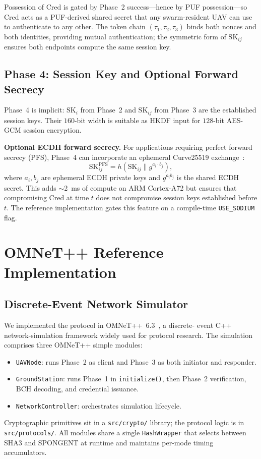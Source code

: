 \documentclass[journal,a4paper,10pt]{IEEEtran}
\begin{document}
Possession of $\mathrm{Cred}$ is gated by Phase~2 success---hence by
PUF possession---so $\mathrm{Cred}$ acts as a PUF-derived shared
secret that any swarm-resident UAV can use to authenticate to any
other. The token chain $(\tau_1,\tau_2,\tau_3)$ binds both nonces and
both identities, providing mutual authentication; the symmetric
form of $\mathrm{SK}_{ij}$ ensures both endpoints compute the same
session key.

\subsection{Phase 4: Session Key and Optional Forward Secrecy}
Phase~4 is implicit: $\mathrm{SK}_i$ from Phase~2 and
$\mathrm{SK}_{ij}$ from Phase~3 are the established session keys.
Their $160$-bit width is suitable as HKDF input for $128$-bit AES-GCM
session encryption.

\textbf{Optional ECDH forward secrecy.} For applications requiring
perfect forward secrecy (PFS), Phase~4 can incorporate an ephemeral
Curve25519 exchange~\cite{puf_key_exchange}:
\begin{equation}
\mathrm{SK}_{ij}^{\mathrm{PFS}} = h(\mathrm{SK}_{ij} \| g^{a_i \cdot b_j}),
\end{equation}
where $a_i, b_j$ are ephemeral ECDH private keys and
$g^{a_i b_j}$ is the shared ECDH secret. This adds $\sim$2~ms of
compute on ARM Cortex-A72 but ensures that compromising
$\mathrm{Cred}$ at time $t$ does not compromise session keys
established before $t$. The reference implementation gates this
feature on a compile-time \texttt{USE\_SODIUM} flag.


\section{OMNeT++ Reference Implementation}
\label{sec:implementation}

\subsection{Discrete-Event Network Simulator}
We implemented the protocol in OMNeT++~6.3~\cite{omnetpp}, a discrete-
event C++ network-simulation framework widely used for protocol
research. The simulation comprises three OMNeT++ simple modules:
\begin{itemize}[leftmargin=*]
\item \texttt{UAVNode}: runs Phase~2 as client and Phase~3 as both
  initiator and responder.
\item \texttt{GroundStation}: runs Phase~1 in
  \texttt{initialize()}, then Phase~2 verification, BCH decoding, and
  credential issuance.
\item \texttt{NetworkController}: orchestrates simulation lifecycle.
\end{itemize}
Cryptographic primitives sit in a \texttt{src/crypto/} library; the
protocol logic is in \texttt{src/protocols/}. All modules share a
single \texttt{HashWrapper} that selects between SHA3 and SPONGENT at
runtime and maintains per-mode timing accumulators.
\end{document}
